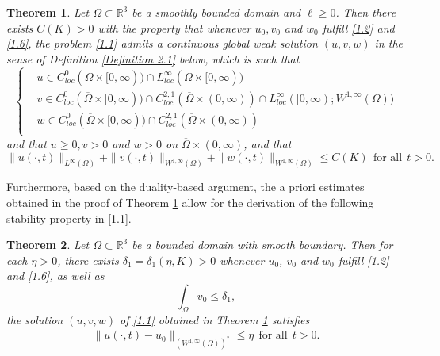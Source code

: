 \documentclass[12pt]{article}
\theoremstyle{plain}
\newtheorem{theorem}{Theorem}[section]
\theoremstyle{definition}
\numberwithin{equation}{section}
\begin{document}
\begin{theorem}\label{theorem 1.1}
	Let $\Omega\subset\mathbb{R}^{3}$ be a smoothly bounded domain and $\ell\geq0$. Then there exists  $C(K)>0$ with the property that whenever $u_0, v_0$ and $w_0$ fulfill \eqref{1.2} and \eqref{1.6}, the problem \eqref{1.1} admits a
 continuous global weak  solution $(u,v,w)$  in the sense of Definition \ref{Definition 2.1} below, which is such that
    \begin{equation}\label{1.7}
\left\{
\begin{aligned}
&u\in C^{0}_{loc}(\overline{\Omega}\times [0,\infty))\cap L^{\infty}_{loc}(\overline{\Omega}\times [0,\infty))\\
&v\in C^{0}_{loc}(\overline{\Omega}\times [0,\infty))\cap C^{2,1}_{loc}(\overline{\Omega}\times (0,\infty))\cap L^{\infty}_{loc}([0,\infty);W^{1,\infty}(\Omega))\\
&w\in C^{0}_{loc}(\overline{\Omega}\times [0,\infty))\cap C^{2,1}_{loc}(\overline{\Omega}\times (0,\infty))\\
\end{aligned}
\right.
\end{equation}
and that  $u\geq0, v>0$ and $w>0$ on $\overline{\Omega}\times(0,\infty)$, and that
\begin{equation}\label{1.8}
    \|u(\cdot,t)\|_{L^\infty(\Omega)}+\|v(\cdot,t)\|_{W^{1,\infty}(\Omega)}+\|w(\cdot,t)\|_{W^{1,\infty}(\Omega)}\leq C(K)~~\mbox{for all}~~t>0.
\end{equation}
\end{theorem}
Furthermore, based on the duality-based argument, the a priori estimates obtained in the proof of Theorem \ref{theorem 1.1} allow for the derivation of the following stability property in \eqref{1.1}.
\begin{theorem}\label{theorem1.2}
Let $\Omega \subset \mathbb R^3$ be a bounded domain with smooth boundary. Then for each $\eta>0$, there exists $\delta_1=\delta_1(\eta, K)>0$ whenever $u_0$, $v_0$ and $w_0$ fulfill
\eqref{1.2} and \eqref{1.6}, as well as
$$\int_{\Omega}v_0\leq \delta_1,$$
the solution $(u,v,w)$ of \eqref{1.1} obtained in Theorem \ref{theorem 1.1} satisfies
\begin{align}\label{1.9}
    \|u(\cdot,t)-u_0\|_{(W^{1,\infty}(\Omega))^*}\leq \eta~~\mbox{for all}~~t>0.
\end{align}
\end{theorem}
\end{document}
